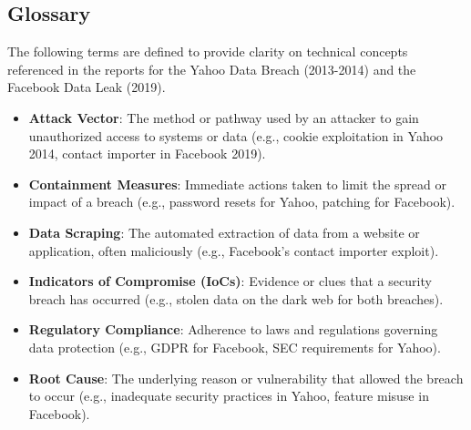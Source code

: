 \documentclass[11pt]{book}
\begin{document}
\clearpage

\subsection{Glossary}
The following terms are defined to provide clarity on technical concepts referenced in the reports for the Yahoo Data Breach (2013-2014) and the Facebook Data Leak (2019).

\begin{itemize}
    \item \textbf{Attack Vector}: The method or pathway used by an attacker to gain unauthorized access to systems or data (e.g., cookie exploitation in Yahoo 2014, contact importer in Facebook 2019).
    \item \textbf{Containment Measures}: Immediate actions taken to limit the spread or impact of a breach (e.g., password resets for Yahoo, patching for Facebook).
    \item \textbf{Data Scraping}: The automated extraction of data from a website or application, often maliciously (e.g., Facebook’s contact importer exploit).
    \item \textbf{Indicators of Compromise (IoCs)}: Evidence or clues that a security breach has occurred (e.g., stolen data on the dark web for both breaches).
    \item \textbf{Regulatory Compliance}: Adherence to laws and regulations governing data protection (e.g., GDPR for Facebook, SEC requirements for Yahoo).
    \item \textbf{Root Cause}: The underlying reason or vulnerability that allowed the breach to occur (e.g., inadequate security practices in Yahoo, feature misuse in Facebook).
\end{itemize}
\end{document}
